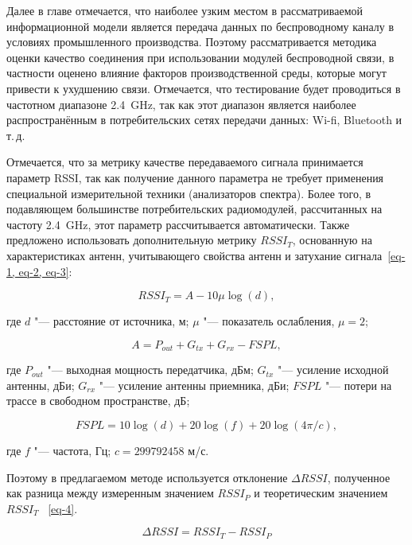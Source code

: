 Далее в главе отмечается, что наиболее узким местом в рассматриваемой информационной модели является передача данных по беспроводному каналу в условиях промышленного производства. Поэтому рассматривается методика оценки качество соединения при использовании модулей беспроводной связи, в частности оценено влияние факторов производственной среды, которые могут привести к ухудшению связи. Отмечается, что тестирование будет проводиться в частотном диапазоне \SI{2,4}{\giga\hertz}, так как этот диапазон является наиболее распространённым в потребительских сетях передачи данных: Wi-fi, Bluetooth и т.\,д. 

Отмечается, что за метрику качестве передаваемого сигнала принимается параметр RSSI, так как получение данного параметра не требует применения специальной измерительной техники (анализаторов спектра). Более того, в подавляющем большинстве потребительских радиомодулей, рассчитанных на частоту \SI{2,4}{\giga\hertz}, этот параметр рассчитывается автоматически. Также предложено использовать дополнительную метрику $RSSI_T$, основанную на характеристиках антенн, учитывающего свойства антенн и затухание сигнала~\cref{eq-1, eq-2, eq-3}:

\begin{equation}
RSSI_T = A-10 \mu\log (d),
\label{eq-1}
\end{equation}

\noindent где $d$ "--- расстояние от источника, м; $\mu$ "--- показатель ослабления, $\mu = 2$;

\begin{equation}
A = P_{out} + G_{tx} + G_{rx} -FSPL,
\label{eq-2}
\end{equation}

\noindent где $P_{out}$ "--- выходная мощность передатчика, дБм; $G_{tx}$ "--- усиление исходной антенны, дБи; $G_{rx}$ "--- усиление антенны приемника, дБи; $FSPL$ "--- потери на трассе в свободном пространстве, дБ;

\begin{equation}
FSPL = 10 \log (d) +20 \log (f) +20 \log (4 \pi/c),
\label{eq-3}
\end{equation}

\noindent где $f$ "--- частота, Гц; $c = 299792458$ м/с.

Поэтому в предлагаемом методе используется отклонение $\Delta RSSI$, полученное как разница между измеренным значением $RSSI_P$ и теоретическим значением $RSSI_T$~ \cref{eq-4}.

\begin{equation}
\Delta RSSI = RSSI_T-RSSI_P
\label{eq-4}
\end{equation}

